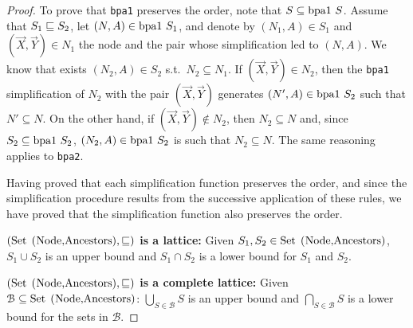 \begin{proof}
	To prove that \lstinline{bpa1} preserves the order,
	note that 
	$S \subseteq \text{\lstinline{bpa1} }S$. Assume that 
	$S_1\sqsubseteq S_2$, let $(N,A)\in \text{\lstinline{bpa1} }S_1$, 
	and denote by $(N_1,A)\in S_1$ and $(\vec X,\vec Y)\in N_1$  
	the node and the pair whose simplification 
	led to $(N,A)$. We know that exists $(N_2,A)\in S_2$
	s.t.\ $N_2 \subseteq N_1$. If $(\vec X,\vec Y)\in N_2$,
	then the \lstinline{bpa1} simplification of $N_2$ with
	the pair $(\vec X,\vec Y)$ generates 
	$(N',A)\in \text{\lstinline{bpa1} }S_2$ such that 
	$N'\subseteq N$. On the other hand, if 
	$(\vec X,\vec Y)\not \in N_2$, then $N_2\subseteq N$ 
	and, since  $S_2 \subseteq \text{\lstinline{bpa1} }S_2$,
	$(N_2,A)\in \text{\lstinline{bpa1} }S_2$ is such that
	$N_2\subseteq N$.
	The same reasoning applies to \lstinline{bpa2}. 
	
	Having proved
	that each simplification function preserves the order, and
	since the simplification procedure results from the successive 
	application of these rules, we have proved that the simplification
	function also preserves the order.\smallskip
	
	\noindent\textbf{$(\text{\lstinline{Set (Node,Ancestors)}}, \leqSets)$
	is a lattice:} Given 
	$S_1, S_2\in \text{\lstinline{Set (Node,Ancestors)}}$,
	$S_1 \cup S_2$ is an upper bound and
	$S_1 \cap S_2$ is a lower bound for $S_1$ and $S_2$.\smallskip
	
	\noindent\textbf{$(\text{\lstinline{Set (Node,Ancestors)}}, \leqSets)$
	is a complete lattice:} Given 
	$\mathcal{B}\subseteq \text{\lstinline{Set (Node,Ancestors)}}$:
	$\bigcup_{S\in \mathcal{B}} S$ is an upper bound and
	$\bigcap_{S\in \mathcal{B}} S$ is a lower bound for the sets in 
	$\mathcal{B}$.
	

\end{proof}

